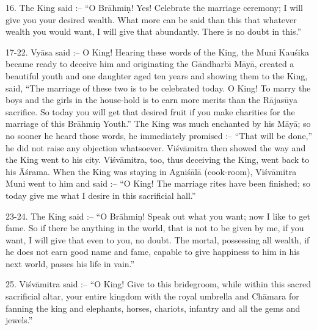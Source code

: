 16. The King said :-- ``O Br\=ahmi\d{n}! Yes! Celebrate the marriage ceremony; I will give you your desired wealth. What more can be said than this that whatever wealth you would want, I will give that abundantly. There is no doubt in this.''

17-22. Vy\=asa said :-- O King! Hearing these words of the King, the Muni Kau\'sika became ready to deceive him and originating the G\=andharb\={\i} M\=ay\=a, created a beautiful youth and one daughter aged ten years and showing them to the King, said, ``The marriage of these two is to be celebrated today. O King! To marry the boys and the girls in the house-hold is to earn more merits than the R\=ajas\=uya sacrifice. So today you will get that desired fruit if you make charities for the marriage of this Br\=ahmi\d{n} Youth.'' The King was much enchanted by his M\=ay\=a; so no sooner he heard those words, he immediately promised :-- ``That will be done,'' he did not raise any objection whatsoever. Vi\'sv\=amitra then showed the way and the King went to his city. Vi\'sv\=amitra, too, thus deceiving the King, went back to his \=A\'srama. When the King was staying in Agni\'s\=al\=a (cook-room), Vi\'sv\=amitra Muni went to him and said :-- ``O King! The marriage rites have been finished; so today give me what I desire in this sacrificial hall.''

23-24. The King said :-- ``O Br\=ahmi\d{n}! Speak out what you want; now I like to get fame. So if there be anything in the world, that is not to be given by me, if you want, I will give that even to you, no doubt. The mortal, possessing all wealth, if he does not earn good name and fame, capable to give happiness to him in his next world, passes his life in vain.''

25. Vi\'sv\=amitra said :-- ``O King! Give to this bridegroom, while within this sacred sacrificial altar, your entire kingdom with the royal umbrella and Ch\=amara for fanning the king and elephants, horses, chariots, infantry and all the gems and jewels.''


